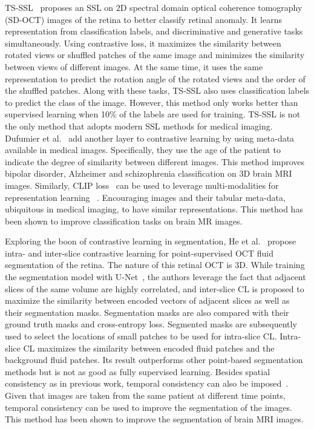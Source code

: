 \documentclass[a4paper,11pt,oneside]{report}
\begin{document}
TS-SSL~\cite{Zhang2021} proposes an SSL on 2D spectral domain optical coherence tomography (SD-OCT) images of the retina to better classify retinal anomaly. It learns representation from classification labels, and discriminative and generative tasks simultaneously. Using contrastive loss, it maximizes the similarity between rotated views or shuffled patches of the same image and minimizes the similarity between views of different images. At the same time, it uses the same representation to predict the rotation angle of the rotated views and the order of the shuffled patches. Along with these tasks, TS-SSL also uses classification labels to predict the class of the image. However, this method only works better than supervised learning when 10\% of the labels are used for training. TS-SSL is not the only method that adopts modern SSL methods for medical imaging. Dufumier et al.~\cite{Dufumier2021} add another layer to contrastive learning by using meta-data available in medical images. Specifically, they use the age of the patient to indicate the degree of similarity between different images. This method improves bipolar disorder, Alzheimer and schizophrenia classification on 3D brain MRI images. Similarly, CLIP loss~\cite{Radford2021CLIP} can be used to leverage multi-modalities for representation learning ~\cite{Hager2023}. Encouraging images and their tabular meta-data, ubiquitous in medical imaging, to have similar representations. This method has been shown to improve classification tasks on brain MR images. 

Exploring the boon of contrastive learning in segmentation, He et al.~\cite{He2022Intra} propose intra- and inter-slice contrastive learning for point-supervised OCT fluid segmentation of the retina. The nature of this retinal OCT is 3D. While training the segmentation model with U-Net~\cite{Ronneberger2015}, the authors leverage the fact that adjacent slices of the same volume are highly correlated, and inter-slice CL is proposed to maximize the similarity between encoded vectors of adjacent slices as well as their segmentation masks. Segmentation masks are also compared with their ground truth masks and cross-entropy loss. Segmented masks are subsequently used to select the locations of small patches to be used for intra-slice CL. Intra-slice CL maximizes the similarity between encoded fluid patches and the background fluid patches. Its result outperforms other point-based segmentation methods but is not as good as fully supervised learning. Besides spatial consistency as in previous work, temporal consistency can also be imposed~\cite{Ren2022}. Given that images are taken from the same patient at different time points, temporal consistency can be used to improve the segmentation of the images. This method has been shown to improve the segmentation of brain MRI images.
\end{document}
